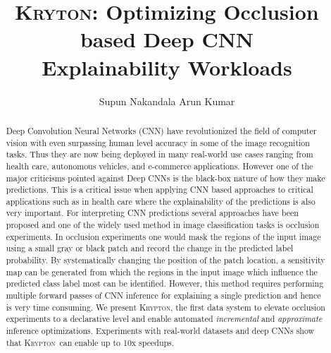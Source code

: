 \documentclass[10, sigconf]{acmart}
\newcommand{\system}{\textsc{Krypton}}
\begin{document}
\title{\textsc{Kryton}: Optimizing Occlusion based Deep CNN\\ Explainability Workloads}

\author{Supun Nakandala \hspace{7mm} Arun Kumar}


\begin{abstract}
Deep Convolution Neural Networks (CNN) have revolutionized the field of computer vision with even surpassing human level accuracy in some of the image recognition tasks. Thus they are now being deployed in many real-world use cases ranging from health care, autonomous vehicles, and e-commerce applications. However one of the major criticisms pointed against Deep CNNs is the black-box nature of how they make predictions. This is a critical issue when applying CNN based approaches to critical applications such as in health care where the explainability of the predictions is also very important. For interpreting CNN predictions several approaches have been proposed and one of the widely used method in image classification tasks is occlusion experiments. In occlusion experiments one would mask the regions of the input image using a small gray or black patch and record the change in the predicted label probability. By systematically changing the position of the patch location, a sensitivity map can be generated from which the regions in the input image which influence the predicted class label most can be identified. However, this method requires performing multiple forward passes of CNN inference for explaining a single prediction and hence is very time consuming.
We present \system, the first data system to elevate occlusion experiments to a declarative level and enable automated \textit{incremental} and \textit{approximate} inference optimizations. Experiments with real-world datasets and deep CNNs show that \system~can enable up to 10x speedups.
\end{abstract}

\maketitle















\end{document}
